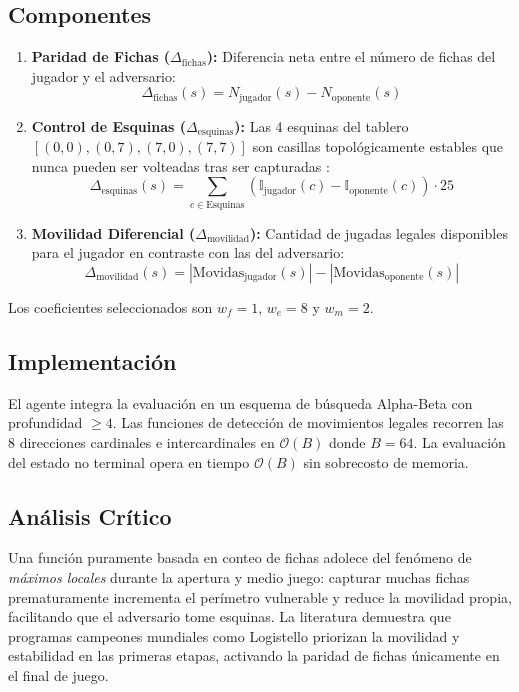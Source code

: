 \documentclass[10pt, a4paper]{article}
\begin{document}
\subsection{Componentes}
\begin{enumerate}
    \item \textbf{Paridad de Fichas ($\Delta_{\text{fichas}}$):} Diferencia neta entre el número de fichas del jugador y el adversario:
    \begin{equation}
    \Delta_{\text{fichas}}(s) = N_{\text{jugador}}(s) - N_{\text{oponente}}(s)
    \end{equation}
    \item \textbf{Control de Esquinas ($\Delta_{\text{esquinas}}$):} Las 4 esquinas del tablero $[(0,0), (0,7), (7,0), (7,7)]$ son casillas topológicamente estables que nunca pueden ser volteadas tras ser capturadas \cite{rosenbloom1982iob}:
    \begin{equation}
    \Delta_{\text{esquinas}}(s) = \sum_{c \in \text{Esquinas}} \left( \mathbb{I}_{\text{jugador}}(c) - \mathbb{I}_{\text{oponente}}(c) \right) \cdot 25
    \end{equation}
    \item \textbf{Movilidad Diferencial ($\Delta_{\text{movilidad}}$):} Cantidad de jugadas legales disponibles para el jugador en contraste con las del adversario:
    \begin{equation}
    \Delta_{\text{movilidad}}(s) = |\text{Movidas}_{\text{jugador}}(s)| - |\text{Movidas}_{\text{oponente}}(s)|
    \end{equation}
\end{enumerate}
Los coeficientes seleccionados son $w_f = 1$, $w_e = 8$ y $w_m = 2$.

\subsection{Implementación}
El agente integra la evaluación en un esquema de búsqueda Alpha-Beta con profundidad $\ge 4$. Las funciones de detección de movimientos legales recorren las 8 direcciones cardinales e intercardinales en $\mathcal{O}(B)$ donde $B = 64$. La evaluación del estado no terminal opera en tiempo $\mathcal{O}(B)$ sin sobrecosto de memoria.

\subsection{Análisis Crítico}
Una función puramente basada en conteo de fichas adolece del fenómeno de \emph{máximos locales} durante la apertura y medio juego: capturar muchas fichas prematuramente incrementa el perímetro vulnerable y reduce la movilidad propia, facilitando que el adversario tome esquinas. La literatura demuestra que programas campeones mundiales como Logistello \cite{buro1999logistello} priorizan la movilidad y estabilidad en las primeras etapas, activando la paridad de fichas únicamente en el final de juego.
\end{document}
